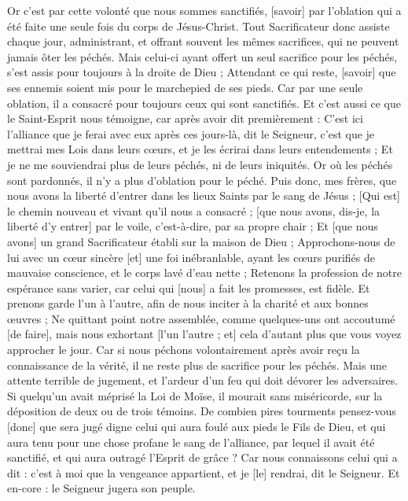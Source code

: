 \begin{multicols}{2}
Or c'est par cette volonté que nous sommes sanctifiés, [savoir] par l'oblation qui a été faite une seule fois du corps de Jésus-Christ.
Tout Sacrificateur donc assiste chaque jour, administrant, et offrant souvent les mêmes sacrifices, qui ne peuvent jamais ôter les péchés.
Mais celui-ci ayant offert un seul sacrifice pour les péchés, s'est assis pour toujours à la droite de Dieu ;
Attendant ce qui reste, [savoir] que ses ennemis soient mis pour le marchepied de ses pieds.
Car par une seule oblation, il a consacré pour toujours ceux qui sont sanctifiés.
Et c'est aussi ce que le Saint-Esprit nous témoigne, car après avoir dit premièrement :
C'est ici l'alliance que je ferai avec eux après ces jours-là, dit le Seigneur, c'est que je mettrai mes Lois dans leurs cœurs, et je les écrirai dans leurs entendements ;
Et je ne me souviendrai plus de leurs péchés, ni de leurs iniquités.
Or où les péchés sont pardonnés, il n'y a plus d'oblation pour le péché.
Puis donc, mes frères, que nous avons la liberté d'entrer dans les lieux Saints par le sang de Jésus ;
[Qui est] le chemin nouveau et vivant qu'il nous a consacré ; [que nous avons, dis-je, la liberté d'y entrer] par le voile, c'est-à-dire, par sa propre chair ;
Et [que nous avons] un grand Sacrificateur établi sur la maison de Dieu ;
Approchons-nous de lui avec un cœur sincère [et] une foi inébranlable, ayant les cœurs purifiés de mauvaise conscience, et le corps lavé d'eau nette ;
Retenons la profession de notre espérance sans varier, car celui qui [nous] a fait les promesses, est fidèle.
Et prenons garde l'un à l'autre, afin de nous inciter à la charité et aux bonnes œuvres ;
Ne quittant point notre assemblée, comme quelques-uns ont accoutumé [de faire], mais nous exhortant [l'un l'autre ; et] cela d'autant plus que vous voyez approcher le jour.
Car si nous péchons volontairement après avoir reçu la connaissance de la vérité, il ne reste plus de sacrifice pour les péchés.
Mais une attente terrible de jugement, et l'ardeur d'un feu qui doit dévorer les adversaires.
Si quelqu'un avait méprisé la Loi de Moïse, il mourait sans miséricorde, sur la déposition de deux ou de trois témoins.
De combien pires tourments pensez-vous [donc] que sera jugé digne celui qui aura foulé aux pieds le Fils de Dieu, et qui aura tenu pour une chose profane le sang de l'alliance, par lequel il avait été sanctifié, et qui aura outragé l'Esprit de grâce ?
Car nous connaissons celui qui a dit : c'est à moi que la vengeance appartient, et je [le] rendrai, dit le Seigneur. Et en-core : le Seigneur jugera son peuple.

\end{multicols}
